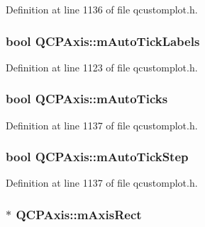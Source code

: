Definition at line 1136 of file qcustomplot.\-h.

\hypertarget{class_q_c_p_axis_a721e496b342f272078c5ff84564e472f}{
\subsubsection[{m\-Auto\-Tick\-Labels}]{\setlength{\rightskip}{0pt plus 5cm}bool Q\-C\-P\-Axis\-::m\-Auto\-Tick\-Labels\hspace{0.3cm}{\ttfamily [protected]}}}\label{class_q_c_p_axis_a721e496b342f272078c5ff84564e472f}


Definition at line 1123 of file qcustomplot.\-h.

\hypertarget{class_q_c_p_axis_aac23adcbae246bf165d4539ad65ac9f9}{
\subsubsection[{m\-Auto\-Ticks}]{\setlength{\rightskip}{0pt plus 5cm}bool Q\-C\-P\-Axis\-::m\-Auto\-Ticks\hspace{0.3cm}{\ttfamily [protected]}}}\label{class_q_c_p_axis_aac23adcbae246bf165d4539ad65ac9f9}


Definition at line 1137 of file qcustomplot.\-h.

\hypertarget{class_q_c_p_axis_aada8934a5c44978653031782aa37d101}{
\subsubsection[{m\-Auto\-Tick\-Step}]{\setlength{\rightskip}{0pt plus 5cm}bool Q\-C\-P\-Axis\-::m\-Auto\-Tick\-Step\hspace{0.3cm}{\ttfamily [protected]}}}\label{class_q_c_p_axis_aada8934a5c44978653031782aa37d101}


Definition at line 1137 of file qcustomplot.\-h.

\hypertarget{class_q_c_p_axis_a6f150b65a202f32936997960e331dfcb}{
\subsubsection[{m\-Axis\-Rect}]{$\ast$ Q\-C\-P\-Axis\-::m\-Axis\-Rect\hspace{0.3cm}{\ttfamily [protected]}}}\label{class_q_c_p_axis_a6f150b65a202f32936997960e331dfcb}


